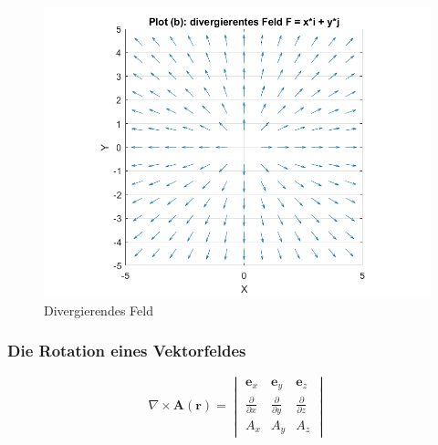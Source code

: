 

\begin{figure}[h!]
	\centering
	\includegraphics[scale=0.4]{papers/helmholtz/images/divergentes_Feld.png}
	\caption{Divergierendes Feld}
	\label{fig:DivergenzAlg}
\end{figure}




\subsubsection{Die Rotation eines Vektorfeldes}
\begin{equation}
\nabla \times \mathbf{A}(\mathbf{r}) = \begin{vmatrix}
	\mathbf{e}_x & \mathbf{e}_y & \mathbf{e}_z \\
	\frac{\partial}{\partial x} & \frac{\partial}{\partial y} & \frac{\partial}{\partial z}\\
	A_x & A_y & A_z
\end{vmatrix}
\end{equation}

